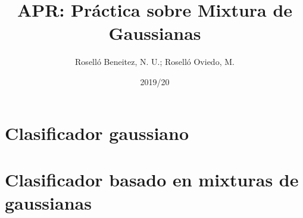 \documentclass[a4paper]{article}
\begin{document}
\author{Roselló Beneitez, N. U.; Roselló Oviedo, M.}
\title{APR: Práctica sobre Mixtura de Gaussianas}
\date{2019/20}
\maketitle{}
\thispagestyle{empty}

\newpage
\section{Clasificador gaussiano}

\newpage
\section{Clasificador basado en mixturas de gaussianas}
\end{document}
